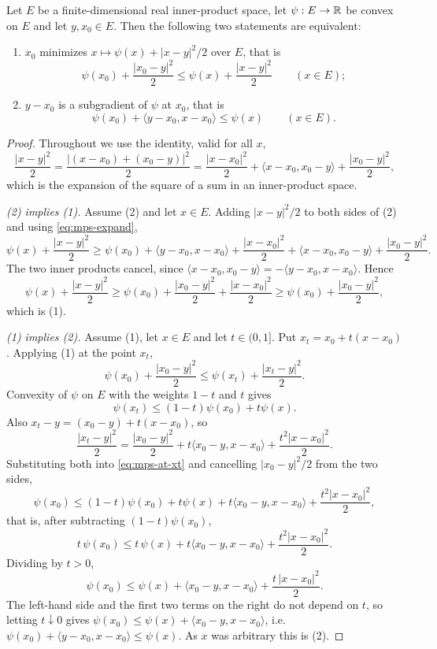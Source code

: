 \begin{lemma}
Let $E$ be a finite-dimensional real inner-product space, let $\psi:E\to\mathbb{R}$ be
convex on $E$ and let $y,x_0\in E$. Then the following two statements are
equivalent:
\begin{enumerate}
\item $x_0$ minimizes $x\mapsto\psi(x)+|x-y|^2/2$ over $E$, that is
\[
  \psi(x_0)+\frac{|x_0-y|^2}{2}\le\psi(x)+\frac{|x-y|^2}{2}\qquad(x\in E);
\]
\item $y-x_0$ is a subgradient of $\psi$ at $x_0$, that is
\[
  \psi(x_0)+\langle y-x_0,x-x_0\rangle\le\psi(x)\qquad(x\in E).
\]
\end{enumerate}
\end{lemma}
\begin{proof}
Throughout we use the identity, valid for all $x$,
\begin{equation}\label{eq:mps-expand}
  \frac{|x-y|^2}{2}
   =\frac{|(x-x_0)+(x_0-y)|^2}{2}
   =\frac{|x-x_0|^2}{2}+\langle x-x_0,x_0-y\rangle+\frac{|x_0-y|^2}{2},
\end{equation}
which is the expansion of the square of a sum in an inner-product space.

\emph{(2) implies (1).}
Assume (2) and let $x\in E$. Adding $|x-y|^2/2$ to both sides of (2) and using
\eqref{eq:mps-expand},
\[
  \psi(x)+\frac{|x-y|^2}{2}
   \ge\psi(x_0)+\langle y-x_0,x-x_0\rangle
      +\frac{|x-x_0|^2}{2}+\langle x-x_0,x_0-y\rangle+\frac{|x_0-y|^2}{2}.
\]
The two inner products cancel, since
$\langle x-x_0,x_0-y\rangle=-\langle y-x_0,x-x_0\rangle$. Hence
\[
  \psi(x)+\frac{|x-y|^2}{2}
   \ge\psi(x_0)+\frac{|x_0-y|^2}{2}+\frac{|x-x_0|^2}{2}
   \ge\psi(x_0)+\frac{|x_0-y|^2}{2},
\]
which is (1).

\emph{(1) implies (2).}
Assume (1), let $x\in E$ and let $t\in(0,1]$. Put $x_t=x_0+t(x-x_0)$. Applying
(1) at the point $x_t$,
\begin{equation}\label{eq:mps-at-xt}
  \psi(x_0)+\frac{|x_0-y|^2}{2}\le\psi(x_t)+\frac{|x_t-y|^2}{2}.
\end{equation}
Convexity of $\psi$ on $E$ with the weights $1-t$ and $t$ gives
\[
  \psi(x_t)\le(1-t)\psi(x_0)+t\psi(x).
\]
Also $x_t-y=(x_0-y)+t(x-x_0)$, so
\[
  \frac{|x_t-y|^2}{2}
   =\frac{|x_0-y|^2}{2}+t\langle x_0-y,x-x_0\rangle+\frac{t^2|x-x_0|^2}{2}.
\]
Substituting both into \eqref{eq:mps-at-xt} and cancelling
$|x_0-y|^2/2$ from the two sides,
\[
  \psi(x_0)\le(1-t)\psi(x_0)+t\psi(x)
    +t\langle x_0-y,x-x_0\rangle+\frac{t^2|x-x_0|^2}{2},
\]
that is, after subtracting $(1-t)\psi(x_0)$,
\[
  t\,\psi(x_0)\le t\,\psi(x)+t\langle x_0-y,x-x_0\rangle
     +\frac{t^2|x-x_0|^2}{2}.
\]
Dividing by $t>0$,
\[
  \psi(x_0)\le\psi(x)+\langle x_0-y,x-x_0\rangle+\frac{t\,|x-x_0|^2}{2}.
\]
The left-hand side and the first two terms on the right do not depend on $t$, so
letting $t\downarrow0$ gives
$\psi(x_0)\le\psi(x)+\langle x_0-y,x-x_0\rangle$, i.e.
$\psi(x_0)+\langle y-x_0,x-x_0\rangle\le\psi(x)$. As $x$ was arbitrary this is
(2).
\end{proof}
